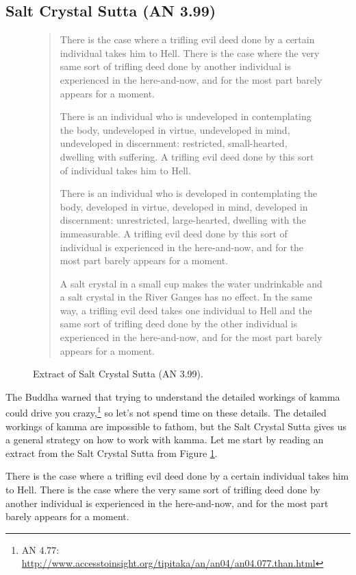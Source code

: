 \subsection*{Salt Crystal Sutta (AN 3.99)}

\begin{figure}[H]
\begin{quotation}
There is the case where a trifling evil deed done by a certain individual takes him to Hell. There is the case where the very same sort of trifling deed done by another individual is experienced in the here-and-now, and for the most part barely appears for a moment.

There is an individual who is undeveloped in contemplating the body, undeveloped in virtue, undeveloped in mind, undeveloped in discernment: restricted, small-hearted, dwelling with suffering. A trifling evil deed done by this sort of individual takes him to Hell.

There is an individual who is developed in contemplating the body, developed in virtue, developed in mind, developed in discernment: unrestricted, large-hearted, dwelling with the immeasurable. A trifling evil deed done by this sort of individual is experienced in the here-and-now, and for the most part barely appears for a moment. 

A salt crystal in a small cup makes the water undrinkable and a salt crystal in the River Ganges has no effect. In the same way, a trifling evil deed takes one individual to Hell and the same sort of trifling deed done by the other individual is experienced in the here-and-now, and for the most part barely appears for a moment.
\end{quotation}
\caption{Extract of Salt Crystal Sutta (AN 3.99).}
\label{fig:AN3_99}
\end{figure}

The Buddha warned that trying to understand the detailed workings of kamma could drive you crazy,\footnote{AN 4.77: \url{http://www.accesstoinsight.org/tipitaka/an/an04/an04.077.than.html}} so let’s not spend time on these details. The detailed workings of kamma are impossible to fathom, but the Salt Crystal Sutta gives us a general strategy on how to work with kamma. Let me start by reading an extract from the Salt Crystal Sutta from Figure \ref{fig:AN3_99}.

There is the case where a trifling evil deed done by a certain individual takes him to Hell. There is the case where the very same sort of trifling deed done by another individual is experienced in the here-and-now, and for the most part barely appears for a moment.

